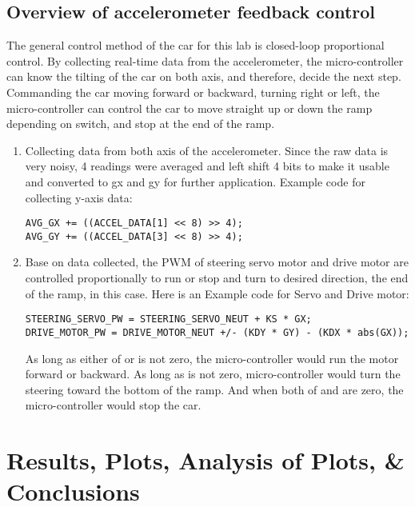 \documentclass[12pt]{article}
\newcommand\code[2][]{
    \tikz[baseline=(s.base)]{
        \node(s)[
            rounded corners,
            fill=black!5,        %
            draw=black,          %
            text=black, %
            inner xsep =3pt,    %
            inner ysep =0pt,    %
            text height=2ex,    %
            text depth =1ex,    %
            #1                  %
        ]{\texttt{#2}};
    }
}
\begin{document}
\subsection{Overview of accelerometer feedback control}
The general control method of the car for this lab is closed-loop proportional control. By collecting real-time data from the accelerometer, the micro-controller can know the tilting of the car on both axis, and therefore, decide the next step. Commanding the car moving forward or backward, turning right or left, the micro-controller can control the car to move straight up or down the ramp depending on switch, and stop at the end of the ramp.
\begin{enumerate}
    \item Collecting data from both axis of the accelerometer. Since the raw data is very noisy, 4 readings were averaged and left shift 4 bits to make it usable and converted to gx and gy for further application. Example code for collecting y-axis data:
        \begin{lstlisting}
AVG_GX += ((ACCEL_DATA[1] << 8) >> 4);
AVG_GY += ((ACCEL_DATA[3] << 8) >> 4);
        \end{lstlisting}
    \item Base on data collected, the PWM of steering servo motor and drive motor are controlled proportionally to run or stop and turn to desired direction, the end of the ramp, in this case. Here is an Example code for Servo and Drive motor:
        \begin{lstlisting}
STEERING_SERVO_PW = STEERING_SERVO_NEUT + KS * GX;
DRIVE_MOTOR_PW = DRIVE_MOTOR_NEUT +/- (KDY * GY) - (KDX * abs(GX));
        \end{lstlisting}
        As long as either of \code{GX} or \code{GY} is not zero, the micro-controller would run the motor forward or backward. As long as \code{GX} is not zero, micro-controller would turn the steering toward the bottom of the ramp. And when both of \code{GX} and \code{GY} are zero, the micro-controller would stop the car.
\end{enumerate}
\newpage
\section{Results, Plots, Analysis of Plots, \& Conclusions}
\end{document}
